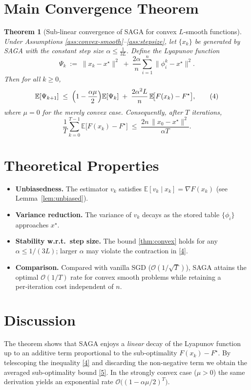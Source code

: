 \documentclass{article}
\newtheorem{theorem}{Theorem}
\newcommand{\E}{\mathbb{E}}
\begin{document}
\section*{Main Convergence Theorem}
\begin{theorem}[Sub‑linear convergence of SAGA for convex $L$‑smooth functions]\label{thm:convex}
Under Assumptions \ref{ass:convex-smooth}–\ref{ass:stepsize}, let $\{x_k\}$ be generated by SAGA with the constant step size $\alpha\le\frac{1}{3L}$. Define the Lyapunov function
\[
\Psi_k\;:=\;\|x_k-x^\star\|^2\;+\;\frac{2\alpha}{n}\sum_{i=1}^{n}\|\phi_i^k-x^\star\|^2 .
\]
Then for all $k\ge0$,
\[
\E[\Psi_{k+1}]\;\le\;\Bigl(1-\frac{\alpha\mu}{2}\Bigr)\E[\Psi_k]\;+\; \frac{2\alpha^2L}{n}\, \E\!\big[ F(x_k)-F^\star\big],
\tag{4}
\]
where $\mu=0$ for the merely convex case. Consequently, after $T$ iterations,
\[
\frac{1}{T}\sum_{k=0}^{T-1}\E\!\big[F(x_k)-F^\star\big]\;\le\;\frac{2n\,\|x_0-x^\star\|^2}{\alpha T}.
\tag{5}
\]
\end{theorem}

\section*{Theoretical Properties}
\begin{itemize}
    \item \textbf{Unbiasedness.} The estimator $v_k$ satisfies $\E[v_k\mid x_k]=\nabla F(x_k)$ (see Lemma~\ref{lem:unbiased}).
    \item \textbf{Variance reduction.} The variance of $v_k$ decays as the stored table $\{\phi_i\}$ approaches $x^\star$.
    \item \textbf{Stability w.r.t.\ step size.} The bound \eqref{thm:convex} holds for any $\alpha\le 1/(3L)$; larger $\alpha$ may violate the contraction in \eqref{4}.
    \item \textbf{Comparison.} Compared with vanilla SGD ($\mathcal{O}(1/\sqrt{T})$), SAGA attains the optimal $\mathcal{O}(1/T)$ rate for convex smooth problems while retaining a per‑iteration cost independent of $n$.
\end{itemize}

\section*{Discussion}
The theorem shows that SAGA enjoys a \emph{linear} decay of the Lyapunov function up to an additive term proportional to the sub‑optimality $F(x_k)-F^\star$. By telescoping the inequality \eqref{4} and discarding the non‑negative term we obtain the averaged sub‑optimality bound \eqref{5}. In the strongly convex case ($\mu>0$) the same derivation yields an exponential rate $\mathcal{O}\big((1-\alpha\mu/2)^T\big)$.
\end{document}

